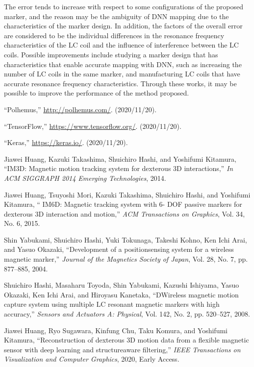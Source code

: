 \documentclass[journal,twoside,web]{ieeecolor}
\begin{document}
The error tends to increase with respect to some configurations of the proposed marker, and the reason may be the ambiguity of DNN mapping due to the characteristics of the marker design. In addition, the factors of the overall error are considered to be the individual differences in the resonance frequency characteristics of the LC coil and the influence of interference between the LC coils. Possible improvements include studying a marker design that has characteristics that enable accurate mapping with DNN, such as increasing the number of LC coils in the same marker, and manufacturing LC coils that have accurate resonance frequency characteristics. Through these works, it may be possible to improve the performance of the method proposed.

\begin{thebibliography}{00}

 ``Polhemus,'' \url{http://polhemus.com/}. (2020/11/20).

 ``TensorFlow,'' \url{https://www.tensorflow.org/}. (2020/11/20).

 ``Keras,'' \url{https://keras.io/}. (2020/11/20).

 Jiawei Huang, Kazuki Takashima, Shuichiro Hashi, and Yoshifumi Kitamura, ``IM3D: Magnetic motion tracking system for dexterous 3D interactions,'' \emph{In ACM SIGGRAPH 2014 Emerging Technologies}, 2014.

 Jiawei Huang, Tsuyoshi Mori, Kazuki Takashima, Shuichiro Hashi,
and Yoshifumi Kitamura, `` IM6D: Magnetic tracking system with 6-
DOF passive markers for dexterous 3D interaction and motion,'' \emph{ACM Transactions on Graphics}, Vol. 34, No. 6, 2015.

 Shin Yabukami, Shuichiro Hashi, Yuki Tokunaga, Takeshi Kohno,
Ken Ichi Arai, and Yasuo Okazaki, ``Development of a positionsensing system for a wireless magnetic marker,'' \emph{Journal of the Magnetics Society of Japan}, Vol. 28, No. 7, pp. 877–885, 2004.

 Shuichiro Hashi, Masaharu Toyoda, Shin Yabukami, Kazushi
Ishiyama, Yasuo Okazaki, Ken Ichi Arai, and Hiroyasu Kanetaka, ``DWireless magnetic motion capture system using multiple LC resonant magnetic markers with high accuracy,'' \emph{Sensors and Actuators A: Physical}, Vol. 142, No. 2, pp. 520–527, 2008.

 Jiawei Huang, Ryo Sugawara, Kinfung Chu, Taku Komura, and
Yoshifumi Kitamura, ``Reconstruction of dexterous 3D motion data
from a flexible magnetic sensor with deep learning and structureaware filtering,'' \emph{IEEE Transactions on Visualization and Computer Graphics}, 2020, Early Access.


\end{thebibliography}
\end{document}
